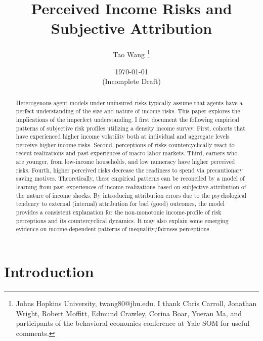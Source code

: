 \documentclass[12pt,notitlepage,onecolumn,aps,pra]{article}
\begin{document}
    
    \title{Perceived Income Risks and Subjective Attribution}\author{Tao Wang \thanks{Johns Hopkins University, twang80@jhu.edu. I thank Chris Carroll, Jonathan Wright, Robert Moffitt, Edmund Crawley, Corina Boar, Yueran Ma, and participants of the behavioral economics conference at Yale SOM for useful comments.}}

\date{\today \\(Incomplete Draft)}
\maketitle\begin{abstract}Heterogenous-agent models under uninsured risks typically assume that agents have a perfect understanding of the size and nature of income risks. This paper explores the implications of the imperfect understanding. I first document the following empirical patterns of subjective risk profiles utilizing a density income survey. First, cohorts that have experienced higher income volatility both at individual and aggregate levels perceive higher-income risks. Second, perceptions of risks countercyclically react to recent realizations and past experiences of macro labor markets. Third, earners who are younger, from low-income households, and low numeracy have higher perceived risks. Fourth, higher perceived risks decrease the readiness to spend via precautionary saving motives. Theoretically, these empirical patterns can be reconciled by a model of learning from past experiences of income realizations based on subjective attribution of the nature of income shocks. By introducing attribution errors due to the psychological tendency to external (internal) attribution for bad (good) outcomes, the model provides a consistent explanation for the non-monotonic income-profile of risk perceptions and its countercyclical dynamics. It may also explain some emerging evidence on income-dependent patterns of inequality/fairness perceptions.\end{abstract}


    
    

    
    \hypertarget{introduction}{%
\section{Introduction}\label{introduction}}
\end{document}
